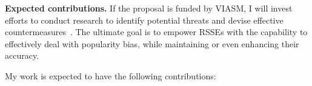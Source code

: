 %


\textbf{Expected contributions.} If the proposal is funded by %
VIASM, %
I will %
invest efforts to conduct %
research to identify potential threats and devise effective countermeasures~\cite{10.1007/978-3-030-49461-2_18}. The ultimate goal is to empower RSSEs %
with the capability to effectively deal with popularity bias, while maintaining or even enhancing their accuracy.

My work is expected to have the following contributions: %

